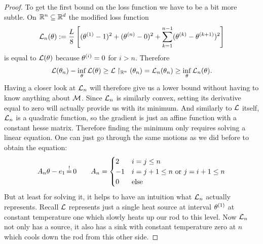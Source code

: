 \begin{proof}
	To get the first bound on the loss function we have to be a bit more subtle.
	On \(\mathbb{R}^n\subseteq \mathbb{R}^d\) the modified loss function
	\begin{align}\label{eq: sink loss}
		\mathcal{L}_n(\theta) := \frac{L}{8}\left[
			(\theta^{(1)} -1)^2
			+ (\theta^{(n)} - 0)^2
			+ \sum_{k=1}^{n-1} (\theta^{(k)} - \theta^{(k+1)})^2
		\right]
	\end{align}
	is equal to \(\mathcal{L}(\theta)\) because \(\theta^{(i)}=0\) for \(i>n\).
	Therefore
	\begin{align*}
		\mathcal{L}(\theta_n) - \inf_{\theta}\mathcal{L}(\theta)
		\ge \mathcal{L}\restriction_{\mathbb{R}^n}(\theta_n) = \mathcal{L}_n(\theta_n)
		\ge \inf_{\theta}\mathcal{L}_n(\theta).
	\end{align*}
	Having a closer look at \(\mathcal{L}_n\) will therefore give us a lower bound
	without having to know anything about \(\mathcal{M}\). Since \(\mathcal{L}_n\)
	is similarly convex, setting its derivative equal to zero will actually provide us
	with its minimum. And similarly to \(\mathcal{L}\) itself, \(\mathcal{L}_n\) is a
	quadratic function, so the gradient is just an affine function with a
	constant hesse matrix. Therefore finding the minimum only requires solving
	a linear equation. One can just go through the same motions as we did
	before to obtain the equation:
	\begin{align}\label{eq: optimality condition for sink loss}
		A_n \weights - \stdBasis_1 \xeq{!} 0 \qquad 
		A_n =\begin{cases}
			2 & i=j\le n \\
			-1 & i=j+1\le n \text{ or } j=i+1\le n \\
			0 & \text{else}
		\end{cases} 
	\end{align}
	But at least for solving it, it helps to have an intuition what \(\mathcal{L}_n\)
	actually represents. Recall \(\mathcal{L}\) represents just
	a single heat source at interval \(\theta^{(1)}\) at constant
	temperature one which slowly heats up our rod to this level. Now
	\(\mathcal{L}_n\) not only has a source, it also has a sink with constant
	temperature zero at \(n\) which cools down the rod from this other side.


\end{proof}
